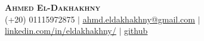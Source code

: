 \documentclass[letterpaper,11pt]{article}
\begin{document}

\begin{center}
    \textbf{\Huge \scshape Ahmed El-Dakhakhny} \\ \vspace{1pt}
    \small (+20) 01115972875 $|$ \href{mailto:ahmd.eldakhakhny@gmail.com}{\underline{ahmd.eldakhakhny@gmail.com}} $|$ 
    \href{https://www.linkedin.com/in/eldakhakhny/}{\underline{linkedin.com/in/eldakhakhny/}} $|$
    \href{https://github.com/xenonzx}{\underline{github}}
\end{center}


\end{document}
